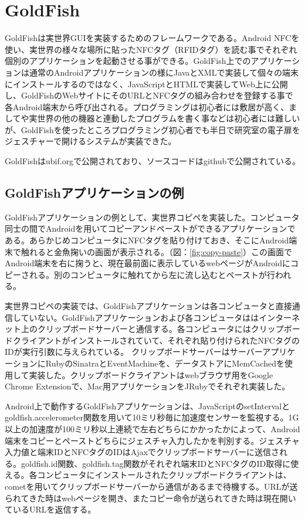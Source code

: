 \section{GoldFish}
GoldFishは実世界GUIを実装するためのフレームワークである。Android NFCを使い、実世界の様々な場所に貼ったNFCタグ（RFIDタグ）を読む事でそれぞれ個別のアプリケーションを起動させる事ができる。GoldFish上でのアプリケーションは通常のAndroidアプリケーションの様にJavaとXMLで実装して個々の端末にインストールするのではなく、JavaScriptとHTMLで実装してWeb上に公開し、GoldFishのWebサイトにそのURLとNFCタグの組み合わせを登録する事で各Android端末から呼び出される。プログラミングは初心者には敷居が高く、ましてや実世界の他の機器と連動したプログラムを書く事などは初心者には難しいが、GoldFishを使ったところプログラミング初心者でも半日で研究室の電子扉をジェスチャーで開けるシステムが実装できた。

GoldFishはubif.org\cite{goldfish}で公開されており、ソースコードはgithubで公開されている。\cite{github}


\subsection{GoldFishアプリケーションの例}
GoldFishアプリケーションの例として、実世界コピペを実装した。コンピュータ同士の間でAndroidを用いてコピーアンドペーストができるアプリケーションである。あらかじめコンピュータにNFCタグを貼り付けておき、そこにAndroid端末で触れると金魚掬いの画面が表示される。（図：\ref{fig:copy-paste}）この画面でAndroid端末を右に掬うと、現在最前面に表示しているwebページがAndroidにコピーされる。別のコンピュータに触れてから左に流し込むとペーストが行われる。

実世界コピペの実装では、GoldFishアプリケーションは各コンピュータと直接通信していない。GoldFishアプリケーションおよび各コンピュータははインターネット上のクリップボードサーバーと通信する。各コンピュータにはクリップボードクライアントがインストールされていて、それぞれ貼り付けられたNFCタグのIDが実行引数に与えられている。
クリップボードサーバーはサーバーアプリケーションにRubyのSinatraとEventMachineを、データストアにMemCachedを使用して実装した。クリップボードクライアントはwebブラウザ用をGoogle Chrome Extensionで、Mac用アプリケーションをJRubyでそれぞれ実装した。

Android上で動作するGoldFishアプリケーションは、JavaScriptのsetIntervalとgoldfish.accelerometer関数を用いて10ミリ秒毎に加速度センサーを監視する。1G以上の加速度が100ミリ秒以上連続で左右どちらにかかったかによって、Android端末をコピーとペーストどちらにジェスチャ入力したかを判別する。ジェスチャ入力値と端末IDとNFCタグのIDはAjaxでクリップボードサーバーに送信される。goldfish.id関数、goldfish.tag関数がそれぞれ端末IDとNFCタグのID取得に使える。各コンピュータにインストールされたクリップボードクライアントは、cometを用いてクリップボードサーバーから通信があるまで待機する。URLが送られてきた時はwebページを開き、またコピー命令が送られてきた時は現在開いているURLを返信する。

